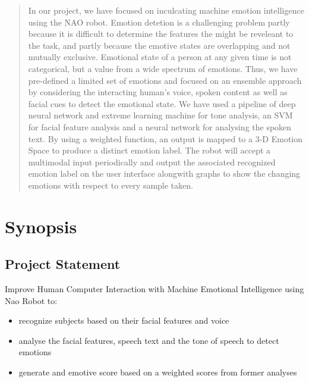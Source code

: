 \documentclass[oneside,a4paper,12pt]{report}
\begin{document}
\begin{normalsize}

\tableofcontents
\listoffigures 
\listoftables

\begin{abstract}
In our project, we have focused on inculcating machine emotion intelligence using the NAO robot. Emotion detetion is a challenging problem partly because it is difficult to determine the features the might be reveleant to the task, and partly because the emotive states are overlapping and not mutually exclusive. Emotional state of a person at any given time is not categorical, but a value from a wide spectrum of emotions. Thus, we have pre-defined a limited set of emotions and focused on an ensemble approach by considering the interacting human's voice, spoken content as well as facial cues to detect the emotional state. We have used a pipeline of deep neural network and extreme learning machine for tone analysis, an SVM for facial feature analysis and a neural network for analysing the spoken text. By using a weighted function, an output is mapped to a 3-D Emotion Space to produce a distinct emotion label. The robot will accept a multimodal input periodically and output the associated recognized emotion label on the user interface alongwith graphs to show the changing emotions with respect to every sample taken.
\end{abstract}


\chapter{Synopsis}

\section{Project Statement}
Improve Human Computer Interaction with Machine Emotional Intelligence using Nao Robot to: 
\begin{itemize}
\item recognize subjects based on their facial features and voice
\item analyse the facial features, speech text and the tone of speech to detect emotions
\item generate and emotive score based on a weighted scores from former analyses
\end{itemize}
\noindent
\vspace{0,2 in}


\end{normalsize}
\end{document}
